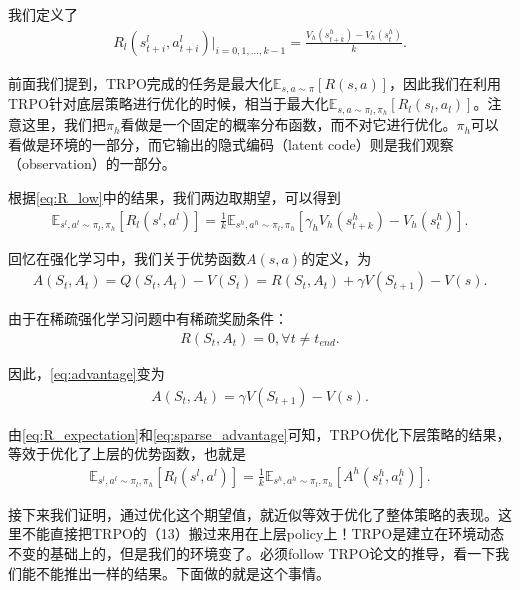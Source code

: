 \documentclass[degree=bachelor, tocarialchapter, pifootnote]{thuthesis}
\begin{document}
我们定义了
\begin{align}
  R_l(s_{t + i}^l, a_{t + i}^l)|_{i = 0,1,...,k-1} = \frac{V_h(s_{t + k}^h) - V_h(s_{t}^h)}{k}.
  \label{eq:R_low}
\end{align}

前面我们提到，TRPO完成的任务是最大化$\mathbb{E}_{s, a \sim \pi}[R(s, a)]$，因此我们在利用TRPO针对底层策略进行优化的时候，相当于最大化$\mathbb{E}_{s, a \sim \pi_l, \pi_h}[R_l(s_l, a_l)]$。注意这里，我们把$\pi_h$看做是一个固定的概率分布函数，而不对它进行优化。$\pi_h$可以看做是环境的一部分，而它输出的隐式编码（latent code）则是我们观察（observation）的一部分。

根据\eqref{eq:R_low}中的结果，我们两边取期望，可以得到
\begin{align}
  \mathbb{E}_{s^l, a^l \sim \pi_l, \pi_h}[R_l(s^l, a^l)] = \frac{1}{k} \mathbb{E}_{s^h, a^h \sim \pi_l, \pi_h}[\gamma_h V_h(s_{t + k}^h) - V_h(s_{t}^h)].
  \label{eq:R_expectation}
\end{align}

回忆在强化学习中，我们关于优势函数$A(s, a)$的定义，为
\begin{align}
  A(S_t, A_t) = Q(S_t, A_t) - V(S_t) = R(S_t, A_t) + \gamma V(S_{t + 1}) - V(s).
  \label{eq:advantage}
\end{align}

由于在稀疏强化学习问题中有稀疏奖励条件：
\begin{align}
  R(S_t, A_t) = 0, \forall t \neq t_{end}.
  \label{eq:sparse_reward_condition}
\end{align}

因此，\eqref{eq:advantage}变为
\begin{align}
  A(S_t, A_t) = \gamma V(S_{t + 1}) - V(s).
  \label{eq:sparse_advantage}
\end{align}

由\eqref{eq:R_expectation}和\eqref{eq:sparse_advantage}可知，TRPO优化下层策略的结果，等效于优化了上层的优势函数，也就是
\begin{align}
  \mathbb{E}_{s^l, a^l \sim \pi_l, \pi_h}[R_l(s^l, a^l)] = \frac{1}{k} \mathbb{E}_{s^h, a^h \sim \pi_l, \pi_h}[A^h(s_t^h, a_t^h)].
  \label{eq:R_expectation_is_advantage}
\end{align}

接下来我们证明，通过优化这个期望值，就近似等效于优化了整体策略的表现。这里不能直接把TRPO的（13）搬过来用在上层policy上！TRPO是建立在环境动态不变的基础上的，但是我们的环境变了。必须follow TRPO论文的推导，看一下我们能不能推出一样的结果。下面做的就是这个事情。
\end{document}
